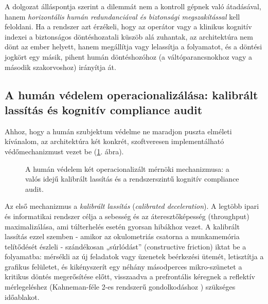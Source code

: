 \documentclass[12pt,a4paper,oneside]{book}
\begin{document}
A dolgozat álláspontja szerint a dilemmát nem a kontroll gépnek való átadásával, hanem \emph{horizontális humán redundanciával és biztonsági megszakítással} kell feloldani. Ha a rendszer azt érzékeli, hogy az operátor vagy a klinikus kognitív indexei a biztonságos döntéshozatali küszöb alá zuhantak, az architektúra nem dönt az ember helyett, hanem megállítja vagy lelassítja a folyamatot, és a döntési jogkört egy másik, pihent humán döntéshozóhoz (a váltóparancsnokhoz vagy a második szakorvoshoz) irányítja át.

\subsection{A humán védelem operacionalizálása: kalibrált lassítás és kognitív compliance audit}

Ahhoz, hogy a humán szubjektum védelme ne maradjon puszta elméleti kívánalom, az architektúra két konkrét, szoftveresen implementálható védőmechanizmust vezet be (\ref{fig:human_protection}. ábra).

\begin{figure}[H]
    \centering
    \caption{A humán védelem két operacionalizált mérnöki mechanizmusa: a valós idejű kalibrált lassítás és a rendszerszintű kognitív compliance audit.}
    \label{fig:human_protection}
\end{figure}

Az első mechanizmus a \emph{kalibrált lassítás} (\emph{calibrated deceleration}). A legtöbb ipari és informatikai rendszer célja a sebesség és az áteresztőképesség (throughput) maximalizálása, ami túlterhelés esetén gyorsan hibákhoz vezet. A kalibrált lassítás ezzel szemben - amikor az okulometriás csatorna a munkamemória telítődését észleli - szándékosan „súrlódást” (constructive friction) iktat be a folyamatba: mérsékli az új feladatok vagy üzenetek beérkezési ütemét, letisztítja a grafikus felületet, és kikényszerít egy néhány másodperces mikro-szünetet a kritikus döntés megerősítése előtt, visszaadva a prefrontális kéregnek a reflektív mérlegeléshez (Kahneman-féle 2-es rendszerű gondolkodáshoz \cite{kahneman1973}) szükséges időablakot.
\end{document}
